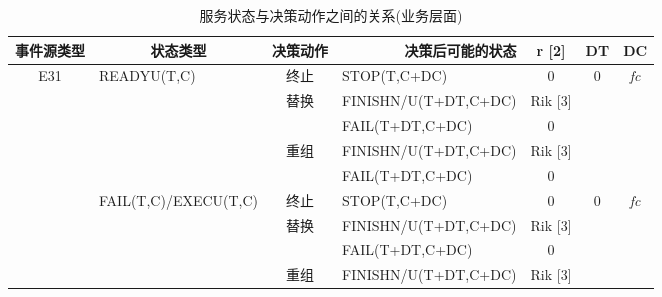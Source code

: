 \begin{table}[htbp]
    \caption{服务状态与决策动作之间的关系(业务层面)}
    \vspace{-0.5em}\label{table:state_action_bp}\centering{}
    \begin{tabular}{rrcrcrr}
        \toprule
        事件源类型 & \multicolumn{1}{c}{状态类型} & 决策动作  & 决策后可能的状态 & r [2] & \multicolumn{1}{c}{DT} & \multicolumn{1}{c}{DC} \\
        \midrule
        \multicolumn{1}{c}{E31} & \multicolumn{1}{l}{\multirow{5}[10]{*}{READYU(T,C)}} & 终止    & \multicolumn{1}{l}{STOP(T,C+DC)} & 0     & \multicolumn{1}{c}{0} & \multicolumn{1}{c}{\textit{fc}} \\
        \multicolumn{1}{c}{} & \multicolumn{1}{l}{} & \multirow{2}[4]{*}{替换} & \multicolumn{1}{l}{FINISHN/U(T+DT,C+DC)} & Rik  [3] & \multicolumn{1}{c}{\multirow{2}[4]{*}{}} & \multicolumn{1}{c}{\multirow{2}[4]{*}{}} \\
        \multicolumn{1}{c}{} & \multicolumn{1}{l}{} &       & \multicolumn{1}{l}{FAIL(T+DT,C+DC)} & 0     & \multicolumn{1}{c}{} & \multicolumn{1}{c}{} \\
        \multicolumn{1}{c}{} & \multicolumn{1}{l}{} & \multirow{2}[4]{*}{重组} & \multicolumn{1}{l}{FINISHN/U(T+DT,C+DC)} & Rik  [3] & \multicolumn{1}{c}{\multirow{2}[4]{*}{}} & \multicolumn{1}{c}{\multirow{2}[4]{*}{}} \\
        \multicolumn{1}{c}{} & \multicolumn{1}{l}{} &       & \multicolumn{1}{l}{FAIL(T+DT,C+DC)} & 0     & \multicolumn{1}{c}{} & \multicolumn{1}{c}{} \\
        \multicolumn{1}{c}{} & \multicolumn{1}{l}{\multirow{5}[10]{*}{FAIL(T,C)/EXECU(T,C)}} & 终止    & \multicolumn{1}{l}{STOP(T,C+DC)} & 0     & \multicolumn{1}{c}{0} & \multicolumn{1}{c}{\textit{fc}} \\
        \multicolumn{1}{c}{} & \multicolumn{1}{l}{} & \multirow{2}[4]{*}{替换} & \multicolumn{1}{l}{FINISHN/U(T+DT,C+DC)} & Rik  [3] & \multicolumn{1}{c}{\multirow{2}[4]{*}{}} & \multicolumn{1}{c}{\multirow{2}[4]{*}{}} \\
        \multicolumn{1}{c}{} & \multicolumn{1}{l}{} &       & \multicolumn{1}{l}{FAIL(T+DT,C+DC)} & 0     & \multicolumn{1}{c}{} & \multicolumn{1}{c}{} \\
        \multicolumn{1}{c}{} & \multicolumn{1}{l}{} & \multirow{2}[4]{*}{重组} & \multicolumn{1}{l}{FINISHN/U(T+DT,C+DC)} & Rik  [3] & \multicolumn{1}{c}{\multirow{2}[4]{*}{}} & \multicolumn{1}{c}{\multirow{2}[4]{*}{}} \\

\end{tabular}
\end{table}

